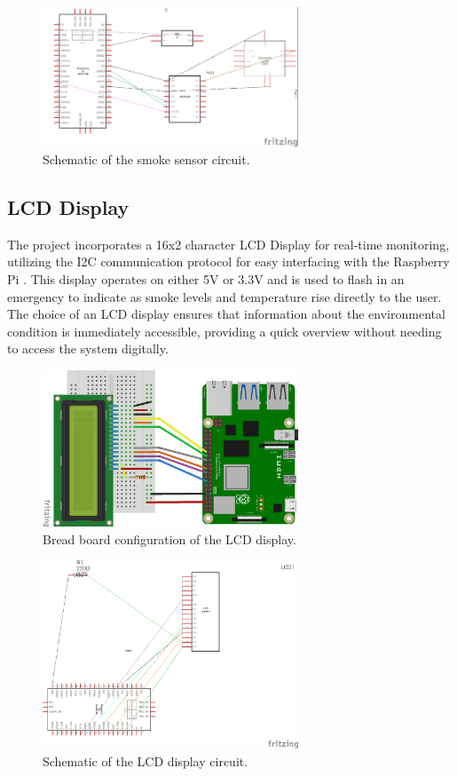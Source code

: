 \begin{figure}[H]
    \centering
    \includegraphics[width=3in]{../assets/schematics/MQ2SensorSchematic.png}
    \caption{Schematic of the smoke sensor circuit.}
\end{figure}

\subsection{LCD Display}

The project incorporates a 16x2 character LCD Display for real-time monitoring, utilizing the I2C communication
protocol for easy interfacing with the Raspberry Pi . This display operates on either 5V or 3.3V and is used to flash
in an emergency to indicate as smoke levels and temperature rise directly to the user. The choice of an LCD display
ensures that information about the environmental condition is immediately accessible, providing a quick overview
without needing to access the system digitally.

\begin{figure}[H]
    \centering
    \includegraphics[width=3in]{../assets/schematics/LCDBB.png}
    \caption{Bread board configuration of the LCD display.}
\end{figure}

\begin{figure}[H]
    \centering
    \includegraphics[width=3in]{../assets/schematics/LCDSchema.png}
    \caption{Schematic of the LCD display circuit.}
\end{figure}

